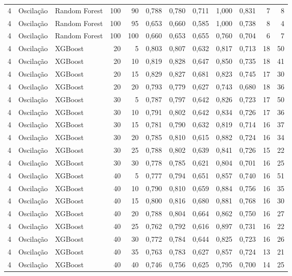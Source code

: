 \begin{longtable}{@{}rllrrrrrrrrr@{}}
4 & Oscilação & Random Forest & 100 & 90 & 0,788 & 0,780 & 0,711 & 1,000 & 0,831 & 7 & 8 \\
4 & Oscilação & Random Forest & 100 & 95 & 0,653 & 0,660 & 0,585 & 1,000 & 0,738 & 8 & 4 \\
4 & Oscilação & Random Forest & 100 & 100 & 0,660 & 0,653 & 0,655 & 0,760 & 0,704 & 6 & 7 \\
4 & Oscilação & XGBoost & 20 & 5 & 0,803 & 0,807 & 0,632 & 0,817 & 0,713 & 18 & 50 \\
4 & Oscilação & XGBoost & 20 & 10 & 0,819 & 0,828 & 0,647 & 0,850 & 0,735 & 18 & 41 \\
4 & Oscilação & XGBoost & 20 & 15 & 0,829 & 0,827 & 0,681 & 0,823 & 0,745 & 17 & 30 \\
4 & Oscilação & XGBoost & 20 & 20 & 0,793 & 0,779 & 0,627 & 0,743 & 0,680 & 18 & 36 \\
4 & Oscilação & XGBoost & 30 & 5 & 0,787 & 0,797 & 0,642 & 0,826 & 0,723 & 17 & 50 \\
4 & Oscilação & XGBoost & 30 & 10 & 0,791 & 0,802 & 0,642 & 0,834 & 0,726 & 17 & 36 \\
4 & Oscilação & XGBoost & 30 & 15 & 0,781 & 0,790 & 0,632 & 0,819 & 0,714 & 16 & 37 \\
4 & Oscilação & XGBoost & 30 & 20 & 0,785 & 0,810 & 0,615 & 0,882 & 0,724 & 16 & 34 \\
4 & Oscilação & XGBoost & 30 & 25 & 0,788 & 0,802 & 0,639 & 0,841 & 0,726 & 15 & 22 \\
4 & Oscilação & XGBoost & 30 & 30 & 0,778 & 0,785 & 0,621 & 0,804 & 0,701 & 16 & 25 \\
4 & Oscilação & XGBoost & 40 & 5 & 0,777 & 0,794 & 0,651 & 0,857 & 0,740 & 16 & 51 \\
4 & Oscilação & XGBoost & 40 & 10 & 0,790 & 0,810 & 0,659 & 0,884 & 0,756 & 16 & 35 \\
4 & Oscilação & XGBoost & 40 & 15 & 0,800 & 0,816 & 0,680 & 0,881 & 0,768 & 16 & 30 \\
4 & Oscilação & XGBoost & 40 & 20 & 0,788 & 0,804 & 0,664 & 0,862 & 0,750 & 16 & 27 \\
4 & Oscilação & XGBoost & 40 & 25 & 0,762 & 0,792 & 0,616 & 0,897 & 0,731 & 16 & 22 \\
4 & Oscilação & XGBoost & 40 & 30 & 0,772 & 0,784 & 0,644 & 0,825 & 0,723 & 16 & 26 \\
4 & Oscilação & XGBoost & 40 & 35 & 0,763 & 0,783 & 0,627 & 0,857 & 0,724 & 13 & 21 \\
4 & Oscilação & XGBoost & 40 & 40 & 0,746 & 0,756 & 0,625 & 0,795 & 0,700 & 14 & 25 \\

\end{longtable}
